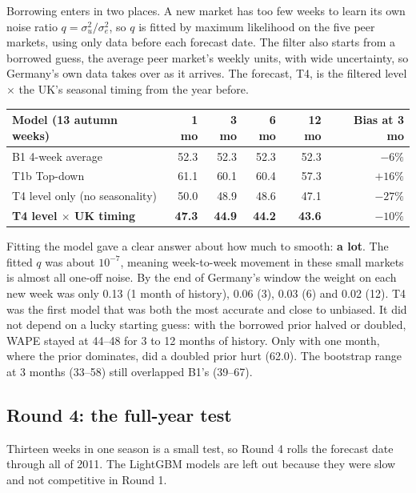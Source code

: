 \documentclass[11pt]{article}
\newcommand{\best}[1]{\textbf{#1}}
\begin{document}
Borrowing enters in two places. A new market has too few weeks to learn its own noise ratio
$q = \sigma_u^2/\sigma_e^2$, so $q$ is fitted by maximum likelihood on the five peer markets, using only
data before each forecast date. The filter also starts from a borrowed guess, the average peer market's
weekly units, with wide uncertainty, so Germany's own data takes over as it arrives. The forecast, T4, is
the filtered level $\times$ the UK's seasonal timing from the year before.

\begin{center}
\begin{tabular}{l r r r r r}
\toprule
Model (13 autumn weeks) & 1 mo & 3 mo & 6 mo & 12 mo & Bias at 3 mo \\
\midrule
B1 4-week average & 52.3 & 52.3 & 52.3 & 52.3 & $-6\%$ \\
T1b Top-down & 61.1 & 60.1 & 60.4 & 57.3 & $+16\%$ \\
T4 level only (no seasonality) & 50.0 & 48.9 & 48.6 & 47.1 & $-27\%$ \\
\best{T4 level $\times$ UK timing} & \best{47.3} & \best{44.9} & \best{44.2} & \best{43.6} & $-10\%$ \\
\bottomrule
\end{tabular}
\end{center}

Fitting the model gave a clear answer about how much to smooth: \textbf{a lot}. The fitted $q$ was about
$10^{-7}$, meaning week-to-week movement in these small markets is almost all one-off noise. By the end of
Germany's window the weight on each new week was only 0.13 (1 month of history), 0.06 (3), 0.03 (6) and
0.02 (12). T4 was the first model that was both the most accurate and close to unbiased. It did not depend
on a lucky starting guess: with the borrowed prior halved or doubled, WAPE stayed at 44--48 for 3 to 12
months of history. Only with one month, where the prior dominates, did a doubled prior hurt (62.0). The
bootstrap range at 3 months (33--58) still overlapped B1's (39--67).

\subsection*{Round 4: the full-year test}

Thirteen weeks in one season is a small test, so Round 4 rolls the forecast date through all of 2011. The
LightGBM models are left out because they were slow and not competitive in Round 1.
\end{document}
